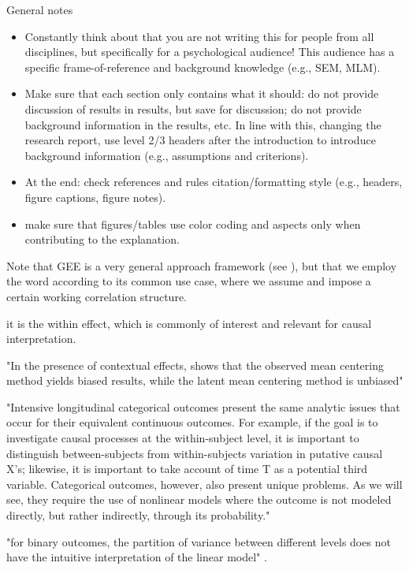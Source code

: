 General notes
\begin{itemize}
    \item Constantly think about that you are not writing this for people from all disciplines, but specifically for a psychological audience! This audience has a specific frame-of-reference and background knowledge (e.g., SEM, MLM).
    \item Make sure that each section only contains what it should: do not provide discussion of results in results, but save for discussion; do not provide background information in the results, etc. In line with this, changing the research report, use level 2/3 headers after the introduction to introduce background information (e.g., assumptions and criterions).
    \item At the end: check references and rules citation/formatting style (e.g., headers, figure captions, figure notes).
    \item make sure that figures/tables use color coding and aspects only when contributing to the explanation. 
\end{itemize}

Note that GEE is a very general approach framework (see \textcite{zeger_models_1988}), but that we employ the word according to its common use case, where we assume and impose a certain working correlation structure.

it is the within effect, which is commonly of interest and relevant for causal interpretation.

"In the presence of contextual effects, \textcite{Ludtke2008} shows that the observed mean centering method yields biased results, while the latent mean centering method is unbiased" \parencite{asparouhov_latent_2019}

"Intensive longitudinal categorical outcomes present the same
analytic issues that occur for their equivalent continuous outcomes.
For example, if the goal is to investigate causal processes at the
within-subject level, it is important to distinguish between-subjects
from within-subjects variation in putative causal X’s; likewise, it is
important to take account of time T as a potential third variable.
Categorical outcomes, however, also present unique problems. As
we will see, they require the use of nonlinear models where the
outcome is not modeled directly, but rather indirectly, through its
probability." \parencite[]{bolger_modeling_2013}

"for binary outcomes, the partition of variance between different levels does not have the intuitive interpretation of the linear model" \parencite{merlo_brief_2006}. 

